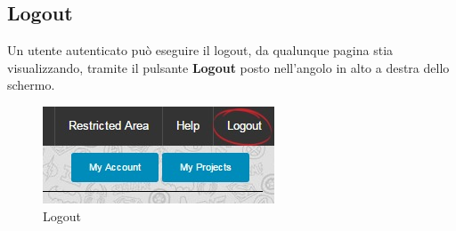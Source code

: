 \subsection{Logout}
Un utente autenticato può eseguire il logout, da qualunque pagina stia visualizzando, tramite il pulsante \textbf{Logout} posto nell'angolo in alto a destra dello schermo.

\begin{figure}[H] 
	\centering 
	\includegraphics[scale=0.80] {img/logout}
	\caption{Logout} 
\end{figure}
